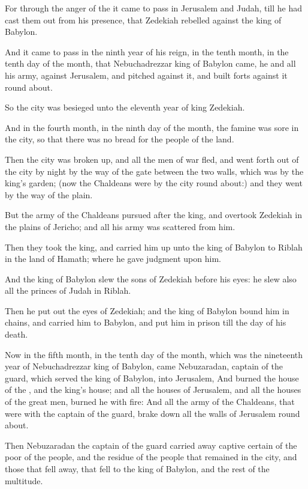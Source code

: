 \verse For through the anger of the \LORD it came to pass in Jerusalem and Judah, till he had cast them out from his presence, that Zedekiah rebelled against the king of Babylon.

\verse And it came to pass in the ninth year of his reign, in the tenth month, in the tenth day of the month, that Nebuchadrezzar king of Babylon came, he and all his army, against Jerusalem, and pitched against it, and built forts against it round about.

\verse So the city was besieged unto the eleventh year of king Zedekiah.

\verse And in the fourth month, in the ninth day of the month, the famine was sore in the city, so that there was no bread for the people of the land.

\verse Then the city was broken up, and all the men of war fled, and went forth out of the city by night by the way of the gate between the two walls, which was by the king's garden; (now the Chaldeans were by the city round about:) and they went by the way of the plain.

\verse But the army of the Chaldeans pursued after the king, and overtook Zedekiah in the plains of Jericho; and all his army was scattered from him.

\verse Then they took the king, and carried him up unto the king of Babylon to Riblah in the land of Hamath; where he gave judgment upon him.

\verse And the king of Babylon slew the sons of Zedekiah before his eyes: he slew also all the princes of Judah in Riblah.

\verse Then he put out the eyes of Zedekiah; and the king of Babylon bound him in chains, and carried him to Babylon, and put him in prison till the day of his death.

\verse Now in the fifth month, in the tenth day of the month, which was the nineteenth year of Nebuchadrezzar king of Babylon, came Nebuzaradan, captain of the guard, which served the king of Babylon, into Jerusalem, \verse And burned the house of the \LORD, and the king's house; and all the houses of Jerusalem, and all the houses of the great men, burned he with fire: \verse And all the army of the Chaldeans, that were with the captain of the guard, brake down all the walls of Jerusalem round about.

\verse Then Nebuzaradan the captain of the guard carried away captive certain of the poor of the people, and the residue of the people that remained in the city, and those that fell away, that fell to the king of Babylon, and the rest of the multitude.

